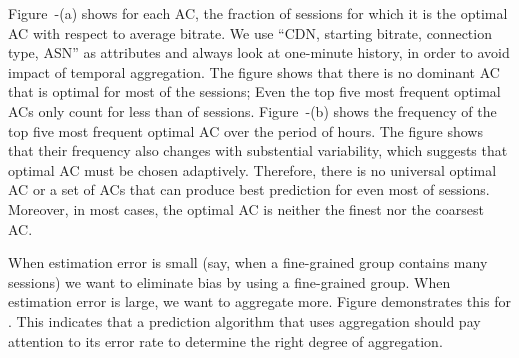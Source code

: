 Figure~\fillme-(a) shows for each AC, the fraction of sessions for which it is the optimal AC with respect to average bitrate. We use ``CDN, starting bitrate, connection type, ASN'' as attributes and always look at one-minute history, in order to avoid impact of temporal aggregation. The figure shows that there is no dominant AC that is optimal for most of the sessions; Even the top five most frequent optimal ACs only count for less than \fillme of sessions. Figure~\fillme-(b) shows the frequency of the top five most frequent optimal AC over the period of \fillme hours. The figure shows that their frequency also changes with substential variability, which suggests that optimal AC must be chosen adaptively.
Therefore, there is no universal optimal AC or a set of ACs that can produce best prediction for even most of sessions. Moreover, in most cases, the optimal AC is neither the finest nor the coarsest AC.

When estimation error is small (say, when a fine-grained group contains many sessions) we want to eliminate bias by using a fine-grained group.  When estimation error is large, we want to aggregate more.  Figure \fillme demonstrates this for \fillme.  This indicates that a prediction algorithm that uses aggregation should pay attention to its error rate to determine the right degree of aggregation.